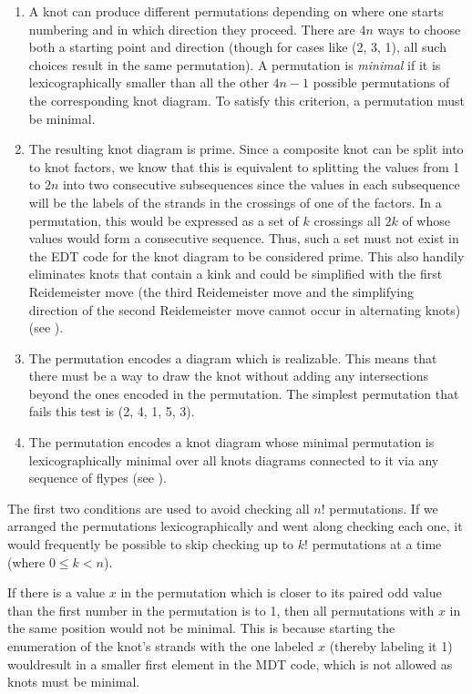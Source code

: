 \begin{paper}
\begin{enumerate}
\item A knot can produce different permutations depending on where one starts
numbering and in which direction they proceed.
There are $4n$ ways to choose both a starting point and direction (though for
cases like (2, 3, 1), all such choices result in the same permutation).
A permutation is \textit{minimal} if it is lexicographically smaller than all
the other $4n-1$ possible permutations of the corresponding knot diagram.
To satisfy this criterion, a permutation must be minimal.

\item The resulting knot diagram is prime.
Since a composite knot can be split into to knot factors, we know that this is
equivalent to splitting the values from 1 to $2n$ into two consecutive
subsequences since the values in each subsequence will be the labels of the
strands in the crossings of one of the factors.
In a permutation, this would be expressed as a set of $k$ crossings all $2k$ of
whose values would form a consecutive sequence.
Thus, such a set must not exist in the EDT code for the knot diagram to be
considered prime.
This also handily eliminates knots that contain a kink and could be simplified
with the first Reidemeister move (the third Reidemeister move and the
simplifying direction of the second Reidemeister move cannot occur in
alternating knots) (see \figMoves).

\item The permutation encodes a diagram which is realizable.
This means that there must be a way to draw the knot without adding any
intersections beyond the ones encoded in the permutation.
The simplest permutation that fails this test is (2, 4, 1, 5, 3).

\item The permutation encodes a knot diagram whose minimal permutation is
lexicographically minimal over all knots diagrams connected to it via any
sequence of flypes (see \figMoves).
\end{enumerate}


The first two conditions are used to avoid checking all $n!$ permutations.
If we arranged the permutations lexicographically and went along checking each
one, it would frequently be possible to skip checking up to $k!$ permutations at
a time (where $0\leq k<n$).

If there is a value $x$ in the permutation which is closer to its paired odd
value than the first number in the permutation is to 1, then all permutations
with $x$ in the same position would not be minimal.
This is because starting the enumeration of the knot's strands with the one
labeled $x$ (thereby labeling it 1) wouldresult in a smaller first element in
the MDT code, which is not allowed as knots must be minimal.


\end{paper}
